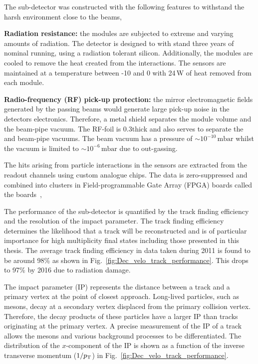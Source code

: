 The \velo sub-detector was constructed with the following features to withstand the harsh environment close to the \lhc beams,
\begin{description}   
\item \textbf{Radiation resistance:} the \velo modules are subjected to extreme and varying amounts of radiation. The detector is designed to with stand three years of nominal \lhc running, using a radiation tolerant silicon. Additionally, the \velo modules are cooled to remove the heat created from the interactions. The sensors are maintained at a temperature between -10 and 0 with 24\,W of heat removed from each module.  
\item \textbf{Radio-frequency (RF) pick-up protection:} the mirror electromagnetic fields generated by the passing \lhc beams would generate large pick-up noise in the \velo detectors electronics. Therefore, a metal shield separates the module volume and the beam-pipe vacuum. The RF-foil is 0.3\mm thick and also serves to separate the \velo and beam-pipe vacuums. The beam vacuum has a pressure of $\sim 10^{-10}\,\text{mbar}$ whilst the \velo vacuum is limited to $\sim 10^{-6}\,\text{mbar}$ due to out-gassing.

\end{description}   

The hits arising from particle interactions in the \velo sensors are extracted from the readout channels using custom analogue chips. The data is zero-suppressed and combined into clusters in Field-programmable Gate Array (FPGA) boards called the \tellone boards~\cite{HAEFELI2006494}, 


The performance of the \velo sub-detector is quantified by the track finding efficiency and the resolution of the impact parameter. 
The track finding efficiency determines the likelihood that a track will be reconstructed and is of particular importance for high multiplicity final states including those presented in this thesis. The average track finding efficiency in data taken during 2011 is found to be around 98\% as shown in Fig.~\ref{fig:Dec_velo_track_performance}. This drops to 97\% by 2016 due to radiation damage.

The impact parameter (IP) represents the distance between a track and a primary vertex at the point of closest approach. Long-lived particles, such as \Bp mesons, decay at a secondary vertex displaced from the primary collision vertex. Therefore, the decay products of these particles have a larger IP than tracks originating at the primary vertex. A precise measurement of the IP of a track allows the \Bp mesons and various background processes to be differentiated. The distribution of the $x$-component of the IP is shown as a function of the inverse transverse momentum ($1/\mbox{$p_{\mathrm{ T}}$}$) in Fig.~\ref{fig:Dec_velo_track_performance}.  

